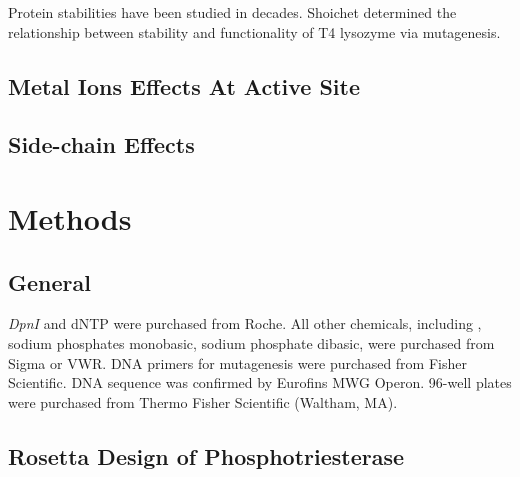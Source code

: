 \begin{refsection}
Protein stabilities have been studied in decades. Shoichet 
determined the relationship between stability and functionality of T4 lysozyme
via mutagenesis\cite{Shoichet1995}. 

\subsection{Metal Ions Effects At Active Site}

\subsection{Side-chain Effects}
\label{sec:side-chain}

\section{Methods}

\subsection{General}

\emph{DpnI} and dNTP were purchased from Roche. All other chemicals, including
, sodium phosphates monobasic, sodium phosphate dibasic, were
purchased from Sigma or VWR. DNA primers for mutagenesis were purchased from
Fisher Scientific. DNA sequence was confirmed by Eurofins MWG Operon.  96-well
plates were purchased from Thermo Fisher Scientific (Waltham,
MA)\cite{Yang2014a}.

\subsection{Rosetta Design of Phosphotriesterase}


\end{refsection}
